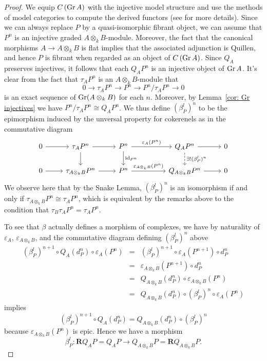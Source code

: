 \begin{proof}
  We equip \(C\left(\operatorname{Gr}A\right)\) with the injective model structure and use the methods of model categories to compute the derived functors (see \textcite{Hovey01} for more details).
  Since we can always replace \(P\) by a quasi-isomorphic fibrant object, we can assume that \(P^n\) is an injective graded \(A \otimes_k B\)-module.
  Moreover, the fact that the canonical morphisms \(A \to A \otimes_k B\) is flat implies that the associated adjunction is Quillen, and hence \(P\) is fibrant when regarded as an object of  \(C\left(\operatorname{Gr}A\right)\).
  Since \(Q_A\) preserves injectives, it follows that each \(Q_A P^n\) is an injective object of \(\operatorname{Gr}A\).
  It's clear from the fact that \(\tau_A P^n\) is an \(A \otimes_k B\)-module that   \[0 \to \tau_A P^n \to P^n \to P^n/\tau_A P^n \to 0\]
  is an exact sequence of \(\operatorname{Gr}(A \otimes_k B)\) for each \(n\).
  Moreover, by Lemma~\ref{cor: Gr injectives} we have \(P^n/\tau_A P^n \cong Q_A P^n\).
  We thus define \((\beta^l_P)^n\) to be the epimorphism induced by the unversal property for cokerenels as in the commutative diagram
  \[\begin{tikzcd}
  0 \arrow{r} & \tau_{A} P^n \arrow{d}\arrow{r} & P^n \arrow{d}{\id_{P^n}}\arrow{rr}{\varepsilon_{A}(P^n)} && Q_{A} P^n \arrow{r}\arrow[dashed]{d}{\exists ! (\beta^l_P)^n} & 0\\
  0 \arrow{r} & \tau_{A \otimes_k B} P^n \arrow{r} & P^n\arrow{rr}{\varepsilon_{A \otimes_k B}(P^n)} && Q_{A \otimes_k B} P^n \arrow{r} & 0 
  \end{tikzcd}\]  We observe here that by the Snake Lemma, \((\beta^l_P)^n\) is an isomorphism if and only if \(\tau_{A \otimes_k B} P^n \cong \tau_A P^n\), which is equivalent by the remarks above to the condition that \(\tau_B \tau_A P^n = \tau_A P^n\).

  To see that \(\beta\) actually defines a morphism of complexes, we have by naturality of \(\varepsilon_A\), \(\varepsilon_{A \otimes_k B}\), and the commutative diagram defining \((\beta^l_P)^n\) above 
  \begin{eqnarray*}
    (\beta^l_P)^{n+1} \circ Q_{A}(d^n_{P}) \circ \varepsilon_{A}(P^n)
    &=& (\beta^l_P)^{n+1} \circ \varepsilon_{A}(P^{n+1}) \circ d^n_{P}\\
    &=& \varepsilon_{A \otimes_k B}(P^{n+1}) \circ d^n_{P}\\
    &=& Q_{A \otimes_k B}(d_{P}^n) \circ \varepsilon_{A \otimes_k B}(P^n)\\
    &=& Q_{A \otimes_k B}(d_{P}^n) \circ (\beta^l_P)^n \circ \varepsilon_{A}(P^n)
  \end{eqnarray*}
  implies
  \[(\beta^l_P)^{n+1} \circ Q_{A}(d^n_{P}) = Q_{A \otimes_k B}(d^n_{P}) \circ (\beta^l_P)^n\]
  because \(\varepsilon_{A \otimes_k B}(P^n)\) is epic. Hence we have a morphism
  \[\beta^l_P \colon \mathbf{R}Q_{A} P = Q_{A} P \to Q_{A \otimes_k B} P = \mathbf{R}Q_{A \otimes_k B} P.\]


\end{proof}
